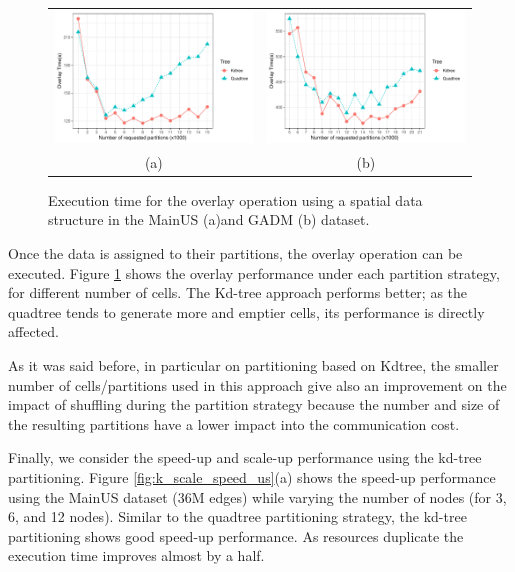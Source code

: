 \begin{figure}
    \centering
    \begin{tabular}{cc}
        \includegraphics[width=0.49\linewidth]{chapterSDCEL/K_Overlay_US.pdf} &
        \includegraphics[width=0.49\linewidth]{chapterSDCEL/K_Overlay_GADM.pdf} \\
        (a) & (b)
    \end{tabular}
    \caption{Execution time for the overlay operation using a spatial data structure in the MainUS (a)and GADM (b) dataset.} \label{fig:k_overlay_us}
\end{figure}

Once the data is assigned to their partitions, the overlay operation can be executed.  Figure \ref{fig:k_overlay_us} shows the overlay performance under each partition strategy, for different number of cells. The Kd-tree approach performs better; as the quadtree tends to generate more and emptier cells, its performance is directly affected.

As it was said before, in particular on partitioning based on Kdtree, the smaller number of cells/partitions used in this approach give also an improvement on the impact of shuffling during the partition strategy because the number and size of the resulting partitions have a lower impact into the communication cost.

Finally, we consider the speed-up and scale-up performance using the kd-tree partitioning. Figure \ref{fig:k_scale_speed_us}(a) shows the speed-up performance using the MainUS dataset (36M edges) while varying the number of nodes (for 3, 6, and 12 nodes). Similar to the quadtree partitioning strategy, the kd-tree partitioning shows good speed-up performance. As resources duplicate the execution time improves almost by a half.

